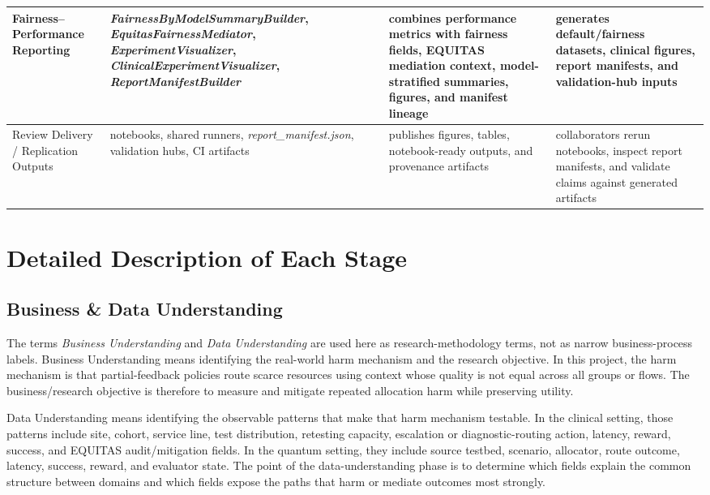 \documentclass{IEEEtran}
\begin{document}
\begin{table}[!t]
\begin{tabularx}{\textwidth}{>{\raggedright\arraybackslash}p{2.7cm} >{\raggedright\arraybackslash}p{4.7cm} >{\raggedright\arraybackslash}p{4.3cm} >{\raggedright\arraybackslash}p{5.0cm}}
\rowcolor{phase4purple!14}
Fairness--Performance Reporting & \textit{FairnessByModelSummaryBuilder}, \textit{EquitasFairnessMediator}, \textit{ExperimentVisualizer}, \textit{ClinicalExperimentVisualizer}, \textit{ReportManifestBuilder} & combines performance metrics with fairness fields, EQUITAS mediation context, model-stratified summaries, figures, and manifest lineage & generates default/fairness datasets, clinical figures, report manifests, and validation-hub inputs \\
\midrule

\rowcolor{phase4purple!10}
Review Delivery / Replication Outputs & notebooks, shared runners, \textit{report\_manifest.json}, validation hubs, CI artifacts & publishes figures, tables, notebook-ready outputs, and provenance artifacts & collaborators rerun notebooks, inspect report manifests, and validate claims against generated artifacts \\
\bottomrule
\end{tabularx}
\end{table}

\section{Detailed Description of Each Stage}

\subsection{Business \& Data Understanding}
The terms \textit{Business Understanding} and \textit{Data Understanding} are used here as research-methodology terms, not as narrow business-process labels. Business Understanding means identifying the real-world harm mechanism and the research objective. In this project, the harm mechanism is that partial-feedback policies route scarce resources using context whose quality is not equal across all groups or flows. The business/research objective is therefore to measure and mitigate repeated allocation harm while preserving utility.

Data Understanding means identifying the observable patterns that make that harm mechanism testable. In the clinical setting, those patterns include site, cohort, service line, test distribution, retesting capacity, escalation or diagnostic-routing action, latency, reward, success, and EQUITAS audit/mitigation fields. In the quantum setting, they include source testbed, scenario, allocator, route outcome, latency, success, reward, and evaluator state. The point of the data-understanding phase is to determine which fields explain the common structure between domains and which fields expose the paths that harm or mediate outcomes most strongly.
\end{document}
